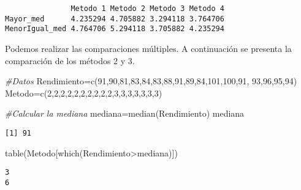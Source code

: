 \documentclass[
  a4paper,
  oneside,
  openany]{book}
\newenvironment{Shaded}{\begin{snugshade}}{\end{snugshade}}
\newcommand{\CommentTok}[1]{\textcolor[rgb]{0.56,0.35,0.01}{\textit{#1}}}
\newcommand{\DecValTok}[1]{\textcolor[rgb]{0.00,0.00,0.81}{#1}}
\newcommand{\FunctionTok}[1]{\textcolor[rgb]{0.00,0.00,0.00}{#1}}
\newcommand{\NormalTok}[1]{#1}
\newcommand{\OtherTok}[1]{\textcolor[rgb]{0.56,0.35,0.01}{#1}}
\newcommand{\SpecialCharTok}[1]{\textcolor[rgb]{0.00,0.00,0.00}{#1}}
\begin{document}
\begin{verbatim}
               Metodo 1 Metodo 2 Metodo 3 Metodo 4
Mayor_med      4.235294 4.705882 3.294118 3.764706
MenorIgual_med 4.764706 5.294118 3.705882 4.235294
\end{verbatim}

Podemos realizar las comparaciones múltiples. A continuación se presenta la comparación de los métodos 2 y 3.

\begin{Shaded}
\begin{Highlighting}[]
\CommentTok{\#Datos}
\NormalTok{Rendimiento}\OtherTok{=}\FunctionTok{c}\NormalTok{(}\DecValTok{91}\NormalTok{,}\DecValTok{90}\NormalTok{,}\DecValTok{81}\NormalTok{,}\DecValTok{83}\NormalTok{,}\DecValTok{84}\NormalTok{,}\DecValTok{83}\NormalTok{,}\DecValTok{88}\NormalTok{,}\DecValTok{91}\NormalTok{,}\DecValTok{89}\NormalTok{,}\DecValTok{84}\NormalTok{,}\DecValTok{101}\NormalTok{,}\DecValTok{100}\NormalTok{,}\DecValTok{91}\NormalTok{,}
              \DecValTok{93}\NormalTok{,}\DecValTok{96}\NormalTok{,}\DecValTok{95}\NormalTok{,}\DecValTok{94}\NormalTok{)}
\NormalTok{Metodo}\OtherTok{=}\FunctionTok{c}\NormalTok{(}\DecValTok{2}\NormalTok{,}\DecValTok{2}\NormalTok{,}\DecValTok{2}\NormalTok{,}\DecValTok{2}\NormalTok{,}\DecValTok{2}\NormalTok{,}\DecValTok{2}\NormalTok{,}\DecValTok{2}\NormalTok{,}\DecValTok{2}\NormalTok{,}\DecValTok{2}\NormalTok{,}\DecValTok{2}\NormalTok{,}\DecValTok{3}\NormalTok{,}\DecValTok{3}\NormalTok{,}\DecValTok{3}\NormalTok{,}\DecValTok{3}\NormalTok{,}\DecValTok{3}\NormalTok{,}\DecValTok{3}\NormalTok{,}\DecValTok{3}\NormalTok{)}

\CommentTok{\#Calcular la mediana}
\NormalTok{mediana}\OtherTok{=}\FunctionTok{median}\NormalTok{(Rendimiento)}
\NormalTok{mediana}
\end{Highlighting}
\end{Shaded}

\begin{verbatim}
[1] 91
\end{verbatim}

\begin{Shaded}
\begin{Highlighting}[]
\FunctionTok{table}\NormalTok{(Metodo[}\FunctionTok{which}\NormalTok{(Rendimiento}\SpecialCharTok{\textgreater{}}\NormalTok{mediana)])}
\end{Highlighting}
\end{Shaded}

\begin{verbatim}
3 
6 
\end{verbatim}
\end{document}
